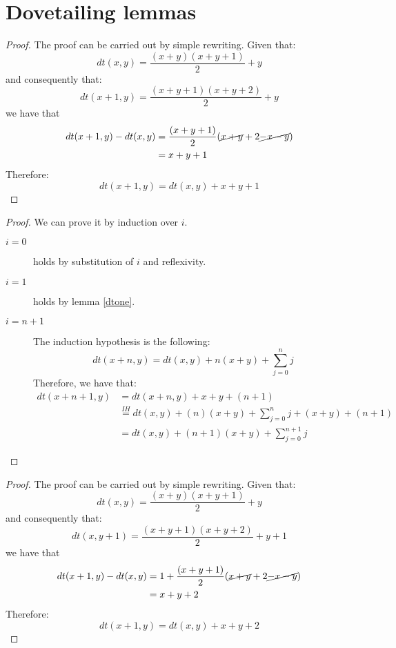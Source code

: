 \chapter{Dovetailing lemmas}

\dtone*
\begin{proof}
	\label{proof:dtone}
The proof can be carried out by simple rewriting. Given that:
\[dt(x,y)=\frac{(x+y)(x+y+1)}{2}+y\]
and consequently that:
\[dt(x+1,y)=\frac{(x+y+1)(x+y+2)}{2}+y\]
we have that
\[\begin{split}
	dt(x+1,y)-dt(x,y)&=\frac{(x+y+1)}{2}(\cancel{x+y}+2\cancel{-x-y})\\
                         &=x+y+1\\
\end{split}\]
Therefore:
\[dt(x+1,y) = dt(x,y) + x +y +1\]
\end{proof}


\dttwo*
\begin{proof}
		\label{proof:dttwo}
We can prove it by induction over $i$. 
\begin{description}
	\item[$i=0$] holds by substitution of $i$ and reflexivity.
	\item[$i=1$] holds by lemma \ref{dtone}.
	\item[$i=n+1$] The induction hypothesis is the following:
	\[dt(x+n,y)=dt(x,y)+n(x+y)+\sum_{j=0}^nj\]
	Therefore, we have that:
\[\begin{split}
dt(x+n+1,y)&=dt(x+n,y)+x+y+(n+1)\\
	&\overset{IH}{=}dt(x,y)+(n)(x+y)+\sum_{j=0}^nj+(x+y)+(n+1)\\
	&=dt(x,y)+(n+1)(x+y)+\sum_{j=0}^{n+1}j
\end{split}\]
\end{description}
\end{proof}

\dtcreat*
\begin{proof}
The proof can be carried out by simple rewriting. Given that:
\[dt(x,y)=\frac{(x+y)(x+y+1)}{2}+y\]
and consequently that:
\[dt(x,y+1)=\frac{(x+y+1)(x+y+2)}{2}+y+1\]
we have that
\[\begin{split}
dt(x+1,y)-dt(x,y)&=1+\frac{(x+y+1)}{2}(\cancel{x+y}+2\cancel{-x-y})\\
&=x+y+2\\
\end{split}\]
Therefore:
\[dt(x+1,y) = dt(x,y) + x +y +2\]
\end{proof}
